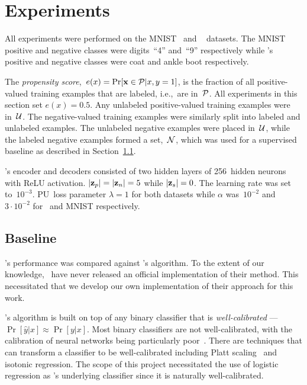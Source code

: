 \section{Experiments}

All experiments were performed on the MNIST~\cite{LeCun:1998} and \fashmnist~\cite{FashionMNIST} datasets. The  MNIST positive and negative classes were digits~``4'' and~``9'' respectively while \fashmnist's positive and negative classes were coat and ankle boot respectively.

The \textit{propensity score},~${e(x)=\Pr[\mathbf{x}\in\mathcal{P}\vert x,y=1]}$, is the fraction of all positive-valued training examples that are labeled, i.e.,~are in~$\mathcal{P}$.  All experiments in this section set ${e(x)=0.5}$. Any unlabeled positive-valued training examples were in~$\mathcal{U}$.  The negative-valued training examples were similarly split into labeled and unlabeled examples.  The unlabeled negative examples were placed in~$\mathcal{U}$, while the labeled negative examples formed a set,~$\mathcal{N}$, which was used for a supervised baseline as described in Section~\ref{sec:Experiments:Baseline}.

\toolname's encoder and decoders consisted of two hidden layers of 256~hidden neurons with ReLU activation.  $\lvert\mathbf{z}_{p}\rvert=\lvert\mathbf{z}_{n}\rvert=5$ while ${\lvert\mathbf{z}_{s}\rvert=0}$.  The learning rate was set to~$10^{-3}$. PU~loss parameter ${\lambda=1}$ for both datasets while ${\alpha}$ was~$10^{-2}$ and ${3\cdot10^{-2}}$ for \fashmnist\ and MNIST respectively.

\subsection{Baseline}\label{sec:Experiments:Baseline}

\toolname's performance was compared against \elkan's algorithm.  To the extent of our knowledge, \elkan\ have never released an official implementation of their method. This necessitated that we develop our own implementation of their approach for this work.

\elkan's algorithm is built on top of any binary classifier that is \textit{well-calibrated} ---~${\Pr[\hat{y} \vert x] \approx \Pr[y \vert x]}$.  Most binary classifiers are not well-calibrated, with the calibration of neural networks being particularly poor~\cite{Guo:2017}.  There are techniques that can transform a classifier to be well-calibrated including Platt scaling~\cite{Platt:1999} and isotonic regression. The scope of this project necessitated the use of logistic regression as \elkan's underlying classifier since it is naturally well-calibrated.

